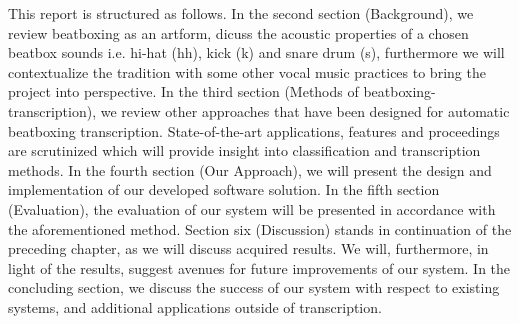 This report is structured as follows. In the second section (Background), we review beatboxing as an artform, dicuss the acoustic properties of a chosen beatbox sounds i.e. hi-hat (hh), kick (k) and snare drum (s), furthermore we will contextualize the tradition with some other vocal music practices to bring the project into perspective. In the third section (Methods of beatboxing- transcription), we review other approaches that have been designed for automatic beatboxing transcription. State-of-the-art applications, features and proceedings are scrutinized which will provide insight into classification and transcription methods. In the fourth section (Our Approach), we will present the design and implementation of our developed software solution. In the fifth section (Evaluation), the evaluation of our system will be presented in accordance with the aforementioned method. Section six (Discussion) stands in continuation of the preceding chapter, as we will discuss acquired results. We will, furthermore, in light of the results, suggest avenues for future improvements of our system. In the concluding section, we discuss the success of our system with respect to existing systems, and additional applications outside of transcription.